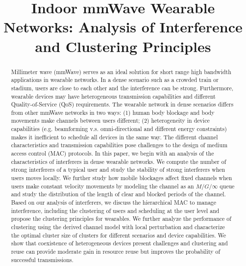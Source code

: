 \documentclass[10pt, conference, letterpaper]{IEEEtran}
\begin{document}
\title{Indoor mmWave Wearable Networks: Analysis of Interference and Clustering Principles}

\author{
}

\maketitle

\begin{abstract}
Millimeter wave (mmWave) serves as an ideal solution for short range high bandwidth applications in wearable networks. In a dense scenario such as a crowded train or stadium, users are close to each other and the interference can be strong. Furthermore, wearable devices may have heterogeneous transmission capabilities and different Quality-of-Service (QoS) requirements. The wearable network in dense scenarios differs from other mmWave networks in two ways: (1) human body blockage and body movements make channels between users different; (2) heterogeneity in device capabilities (e.g. beamforming v.s. omni-directional and different energy constraints) makes it inefficient to schedule all devices in the same way. The different channel characteristics and transmission capabilities pose challenges to the design of medium access control (MAC) protocols. In this paper, we begin with an analysis of the characteristics of interferers in dense wearable networks. We compute the number of strong interferers of a typical user and study the stability of strong interferers when users moves locally. We further study how mobile blockages affect fixed channels when users make constant velocity movements by modeling the channel as an $M/G/\infty$ queue and study the distribution of the length of clear and blocked periods of the channel. Based on our analysis of interferers, we discuss the hierarchical MAC to manage interference, including the clustering of users and scheduling at the user level and propose the clustering principles for wearables. We further analyze the performance of clustering using the derived channel model with local perturbation and characterize the optimal cluster size of clusters for different scenarios and device capabilities. We show that coexistence of heterogeneous devices present challenges and clustering and reuse can provide moderate gain in resource reuse but improves the probability of successful transmissions. 


\end{abstract}
\IEEEpeerreviewmaketitle
\end{document}
